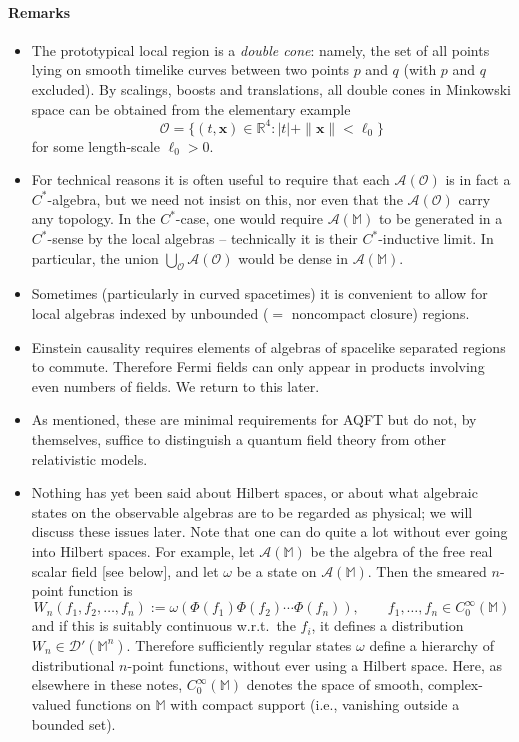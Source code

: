 \documentclass[12pt]{article}
\newcommand{\1}{\mathds{1}}                         %
\newcommand{\RR}{\mathbb{R}}           %
\newcommand{\Ocal}{\mathcal{O}}
\newcommand{\MM}{\mathbb{M}}
\newcommand{\DD}{{\mathscr{D}}}
\newcommand{\xb}{{\boldsymbol{x}}}
\newcommand{\Ac}{{\mathcal{A}}}
\newcommand{\CoinX}[1]{C_0^\infty(#1)}
\begin{document}
	\paragraph{Remarks}
	\begin{itemize}
	\item The prototypical local region is a \emph{double cone}: namely, the set of all points
	lying on smooth timelike curves between two points $p$ and $q$ (with $p$ and $q$ excluded). By scalings, boosts and translations, all double cones in Minkowski space can be obtained from the elementary example
	\[
	\Ocal = \{(t,\xb)\in\RR^4: |t|+\|\xb\| < \ell_0 \}
	\]
	for some length-scale $\ell_0>0$.  
	\item For technical reasons it is often useful to require that each $\Ac(\Ocal)$ is in fact a $C^*$-algebra, but we need not insist on this, nor even that the $\Ac(\Ocal)$ carry any topology. In the $C^*$-case, one would require $\Ac(\MM)$ to be generated in a $C^*$-sense by the local algebras -- technically it is their $C^*$-inductive limit. In particular, the union $\bigcup_{\Ocal}\Ac(\Ocal)$ would be dense in $\Ac(\MM)$. 	
	\item Sometimes (particularly in curved spacetimes) it is convenient to allow for local algebras indexed by unbounded ($=$ noncompact closure) regions. 
 
	\item Einstein causality requires elements of algebras of spacelike separated regions to commute. Therefore Fermi fields can only appear in products involving even numbers of fields. We return to this later.	
	\item As mentioned, these are minimal requirements for AQFT but do not, by themselves, suffice to distinguish a quantum field theory from other relativistic models. 
	\item Nothing has yet been said about Hilbert spaces, or about what algebraic states on the observable algebras are to be regarded as physical; we will discuss these issues later. Note that one can do quite a lot without ever going into Hilbert spaces. For example, 
		let $\Ac(\MM)$ be the algebra of the free real scalar field [see below], and let $\omega$ be a state on $\Ac(\MM)$. Then the smeared $n$-point function is
		\[
		W_n(f_1,f_2,\ldots,f_n) := \omega(\Phi(f_1)\Phi(f_2)\cdots \Phi(f_n)), \qquad f_1,\ldots,f_n\in\CoinX{\MM}
		\]
		and if this is suitably continuous w.r.t.\ the $f_i$, it defines a distribution $W_n\in\DD'(\MM^n)$. 
		Therefore sufficiently regular states $\omega$ define a hierarchy of distributional $n$-point functions, without ever using a Hilbert space. Here, as elsewhere in these notes, $\CoinX{\MM}$ denotes the space of smooth, complex-valued functions on $\MM$ with compact support (i.e., vanishing outside a bounded set).
	\end{itemize}
	
\end{document}
